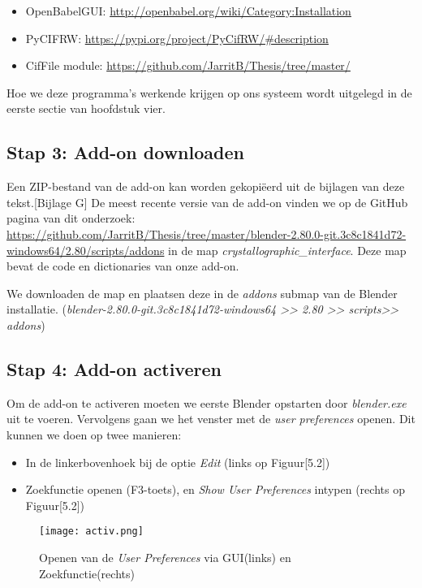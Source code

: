 \begin{itemize}
\item OpenBabelGUI: \url{http://openbabel.org/wiki/Category:Installation}
\item PyCIFRW: \url{https://pypi.org/project/PyCifRW/#description}
\item CifFile module: \url{https://github.com/JarritB/Thesis/tree/master/} 
\end{itemize}   

Hoe we deze programma's werkende krijgen op ons systeem wordt uitgelegd in de eerste sectie van hoofdstuk vier. 
\par

\subsection{Stap 3: Add-on downloaden}
Een ZIP-bestand van de add-on kan worden gekopiëerd uit de bijlagen van deze tekst.[Bijlage G] De meest recente versie van de add-on vinden we op de GitHub pagina van dit onderzoek: \url{https://github.com/JarritB/Thesis/tree/master/blender-2.80.0-git.3c8c1841d72-windows64/2.80/scripts/addons} in de map \textit{crystallographic\_interface}. Deze map bevat de code en dictionaries van onze add-on.
\par  
We downloaden de map en plaatsen deze in de \textit{addons} submap van de Blender installatie. (\textit{blender-2.80.0-git.3c8c1841d72-windows64 \textgreater \textgreater{} 2.80 \textgreater \textgreater{} scripts\textgreater \textgreater{} addons}) 

\subsection{Stap 4: Add-on activeren}
Om de add-on te activeren moeten we eerste Blender opstarten door \textit{blender.exe} uit te voeren. Vervolgens gaan we het venster met de \textit{user preferences} openen. Dit kunnen we doen op twee manieren: 
\begin{itemize}
\item In de linkerbovenhoek bij de optie \textit{Edit} (links op Figuur[5.2])
\item Zoekfunctie openen (F3-toets), en \textit{Show User Preferences} intypen (rechts op Figuur[5.2]) 
\end{itemize}     

\begin{figure}[h]
\begin{center}
\texttt{[image: activ.png]}
\caption{Openen van de \textit{User Preferences} via GUI(links) en Zoekfunctie(rechts)}
\end{center}
\end{figure}
 
